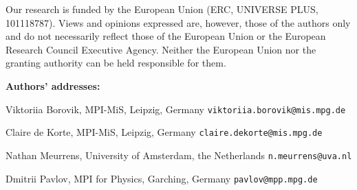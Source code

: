 \documentclass[12pt,a4paper]{extarticle}
\theoremstyle{definition}
\begin{document}
Our research is funded by the European Union (ERC, UNIVERSE PLUS, 101118787). Views and opinions expressed are, however, those of the authors only and do not necessarily reflect those of the European Union or the European Research Council Executive Agency. Neither the European Union nor the granting authority can be held responsible for them. 

\printbibliography[heading=bibintoc]

\bigskip \medskip \bigskip

\noindent
\small {\bf Authors' addresses:}
\smallskip

\noindent Viktoriia Borovik, MPI-MiS, Leipzig, Germany
\hfill {\tt viktoriia.borovik@mis.mpg.de}

\noindent Claire de Korte, MPI-MiS, Leipzig, Germany
\hfill {\tt claire.dekorte@mis.mpg.de}

\noindent Nathan Meurrens, University of Amsterdam, the Netherlands
\hfill {\tt n.meurrens@uva.nl}

\noindent Dmitrii Pavlov, MPI for Physics, Garching, Germany
\hfill {\tt pavlov@mpp.mpg.de}
\end{document}
